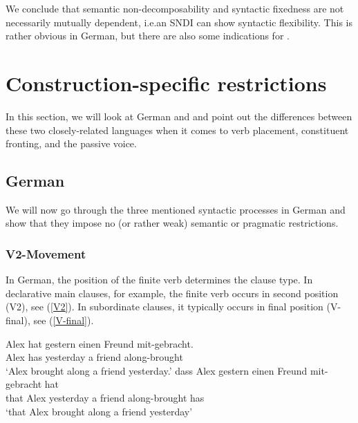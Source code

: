 \documentclass[output=paper]{langsci/langscibook}
\begin{document}
We conclude that semantic non-decomposability and syntactic fixedness are not necessarily mutually dependent, i.e.\@ an SNDI can show syntactic flexibility. This is rather obvious in  German, but there are also some indications for .


\largerpage
\section{Construction-specific restrictions}
\label{Sec-ConstructionSpecificRestrictions}


In this section, we will look at German and  and point out the differences between these two closely-related languages when it comes to verb placement, constituent fronting, and the  passive voice.



\subsection{German}
\label{Sec-RestrictionsGerman}

We will now go through the three mentioned syntactic processes in German and show that they impose no (or rather weak) semantic or pragmatic restrictions.



\subsubsection{V2-Movement}

In German, the position of the finite verb determines the clause type. In declarative main clauses, for example, the finite verb occurs in second position (V2), see (\ref{V2}). In subordinate clauses, it typically occurs in final position (V-final), see (\ref{V-final}).


\ea
\ea\label{V2-vs.-V-final}
\gll Alex hat gestern einen Freund mit-gebracht. \\
Alex has yesterday a friend along-brought \\
\glt `Alex brought along a friend yesterday.' \label{V2}
\ex
\gll dass Alex gestern einen Freund mit-gebracht hat \\
that Alex yesterday a friend along-brought has \\
\glt `that Alex brought along a friend yesterday' \label{V-final}
\z
\z
\end{document}
